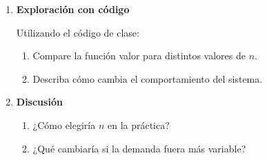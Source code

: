 \documentclass[12pt]{article}
\begin{document}
\begin{enumerate}
\begin{enumerate}
\item \textbf{Exploración con código}

Utilizando el código de clase:

\begin{enumerate}
\item Compare la función valor para distintos valores de $n$.
\item Describa cómo cambia el comportamiento del sistema.
\end{enumerate}

\item \textbf{Discusión}
\begin{enumerate}
\item ¿Cómo elegiría $n$ en la práctica?
\item ¿Qué cambiaría si la demanda fuera más variable?
\end{enumerate}

\end{enumerate}

\end{enumerate}
\end{document}
